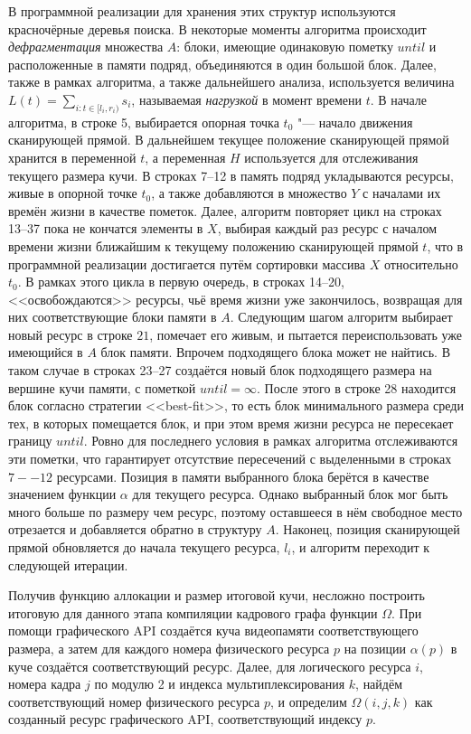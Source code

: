 В программной реализации для хранения этих структур используются красночёрные деревья поиска.
В некоторые моменты алгоритма происходит \textit{дефрагментация} множества $A$: блоки, имеющие одинаковую пометку $until$ и расположенные в памяти подряд, объединяются в один большой блок.
Далее, также в рамках алгоритма, а также дальнейшего анализа, используется величина $L(t) = \sum_{i: t \in [l_i, r_i)} s_i$, называемая \textit{нагрузкой} в момент времени $t$.
В начале алгоритма, в строке 5, выбирается опорная точка $t_0$ "--- начало движения сканирующей прямой.
В дальнейшем текущее положение сканирующей прямой хранится в переменной $t$, а переменная $H$ используется для отслеживания текущего размера кучи.
В строках 7--12 в память подряд укладываются ресурсы, живые в опорной точке $t_0$, а также добавляются в множество $Y$ с началами их времён жизни в качестве пометок.
Далее, алгоритм повторяет цикл на строках 13--37 пока не кончатся элементы в $X$, выбирая каждый раз ресурс с началом времени жизни ближайшим к текущему положению сканирующей прямой $t$, что в программной реализации достигается путём сортировки массива $X$ относительно $t_0$.
В рамках этого цикла в первую очередь, в строках 14--20, <<освобождаются>> ресурсы, чьё время жизни уже закончилось, возвращая для них соответствующие блоки памяти в $A$.
Следующим шагом алгоритм выбирает новый ресурс в строке $21$, помечает его живым, и пытается переиспользовать уже имеющийся в $A$ блок памяти.
Впрочем подходящего блока может не найтись.
В таком случае в строках 23--27 создаётся новый блок подходящего размера на вершине кучи памяти, с пометкой $until = \infty$.
После этого в строке 28 находится блок согласно стратегии <<best-fit>>, то есть блок минимального размера среди тех, в которых помещается блок, и при этом время жизни ресурса не пересекает границу $until$.
Ровно для последнего условия в рамках алгоритма отслеживаются эти пометки, что гарантирует отсутствие пересечений с выделенными в строках $7--12$ ресурсами.
Позиция в памяти выбранного блока берётся в качестве значением функции $\alpha$ для текущего ресурса.
Однако выбранный блок мог быть много больше по размеру чем ресурс, поэтому оставшееся в нём свободное место отрезается и добавляется обратно в структуру $A$.
Наконец, позиция сканирующей прямой обновляется до начала текущего ресурса, $l_i$, и алгоритм переходит к следующей итерации.

Получив функцию аллокации и размер итоговой кучи, несложно построить итоговую для данного этапа компиляции кадрового графа функции $\Omega$.
При помощи графического API создаётся куча видеопамяти соответствующего размера, а затем для каждого номера физического ресурса $p$ на позиции $\alpha(p)$ в куче создаётся соответствующий ресурс.
Далее, для логического ресурса $i$, номера кадра $j$ по модулю 2 и индекса мультиплексирования $k$, найдём соответствующий номер физического ресурса $p$, и определим $\Omega(i, j, k)$ как созданный ресурс графического API, соответствующий индексу $p$.

